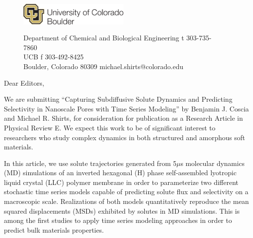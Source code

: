 \documentclass[fontsize=11pt]{article}
\begin{document}
	\graphicspath{{./figures/}}

	\begin{figure}
	\centering
	\begin{minipage}{0.37\textwidth}
	\includegraphics[width=2.14in,left]{CUBoulder.pdf}
	\end{minipage}
	\begin{minipage}{0.62\textwidth}
	\scriptsize
	\noindent Department of Chemical and Biological Engineering \hfill t 303-735-7860~~~~~~~~~~~~~~~~~~ \\
	 UCB \hfill f 303-492-8425~~~~~~~~~~~~~~~~~~ \\
	\noindent Boulder, Colorado 80309 \hfill michael.shirts@colorado.edu \\
	\end{minipage}
	\end{figure}
	
	\noindent \date

	\noindent Dear Editors,\\
	
	\newcommand{\ManuscriptTitle}{Capturing Subdiffusive Solute Dynamics and 
	Predicting Selectivity in Nanoscale Pores with Time Series Modeling}
	
	We are submitting ``\ManuscriptTitle'' by Benjamin J. Coscia and Michael R.
	Shirts, for	consideration for publication as a Research Article in Physical 
	Review E. We expect this work to be of significant interest to researchers 
	who study complex dynamics in both structured and amorphous soft materials.
	
	In this article, we use solute trajectories generated from 5$\mu$s molecular
	dynamics (MD) simulations of an inverted hexagonal (H) phase
	self-assembled lyotropic liquid crystal (LLC) polymer membrane in order to 
	parameterize two different stochastic time series models capable of predicting
	solute flux and selectivity on a macroscopic scale. Realizations of both models
	quantitatively reproduce the mean squared displacements (MSDs) exhibited by 
	solutes in MD simulations. This is among the first studies to apply time 
	series modeling approaches in order to predict bulk materials properties. 
\end{document}
